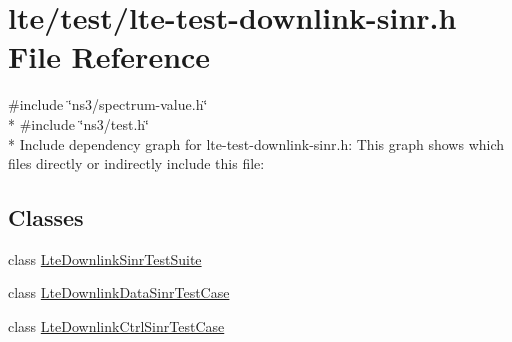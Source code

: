 \hypertarget{lte-test-downlink-sinr_8h}{}\section{lte/test/lte-\/test-\/downlink-\/sinr.h File Reference}
\label{lte-test-downlink-sinr_8h}
{\ttfamily \#include \char`\"{}ns3/spectrum-\/value.\+h\char`\"{}}\\*
{\ttfamily \#include \char`\"{}ns3/test.\+h\char`\"{}}\\*
Include dependency graph for lte-\/test-\/downlink-\/sinr.h\+:
This graph shows which files directly or indirectly include this file\+:
\subsection*{Classes}
\begin{DoxyCompactItemize}
\item 
class \hyperlink{classLteDownlinkSinrTestSuite}{Lte\+Downlink\+Sinr\+Test\+Suite}
\item 
class \hyperlink{classLteDownlinkDataSinrTestCase}{Lte\+Downlink\+Data\+Sinr\+Test\+Case}
\item 
class \hyperlink{classLteDownlinkCtrlSinrTestCase}{Lte\+Downlink\+Ctrl\+Sinr\+Test\+Case}
\end{DoxyCompactItemize}
